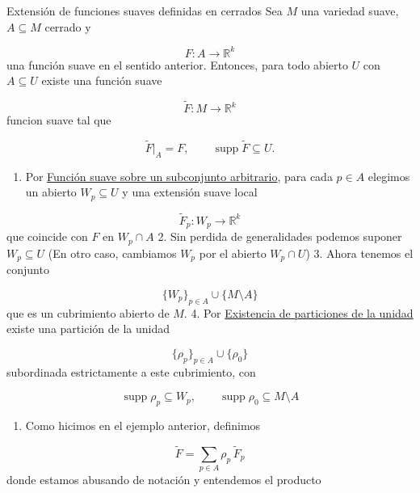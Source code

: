 \label{blk:cf02ec}
\begin{bookproposition}{Extensión de funciones suaves definidas en cerrados}
Sea $M$ una variedad suave, $A\subseteq M$ cerrado y

\[
F:A\to\mathbb R^k
\]
una función suave en el sentido anterior. Entonces, para todo abierto $U$ con $A\subseteq U$ existe una función suave

\[
\widetilde F:M\to\mathbb R^k
\]
funcion suave tal que

\[
\widetilde F|_A=F,
\qquad
\operatorname{supp}\widetilde F\subseteq U.
\]
\end{bookproposition}
\begin{bookproof}{}
\begin{enumerate}
\item Por \hyperref[blk:cf02ec]{Función suave sobre un subconjunto arbitrario}, para cada $p\in A$ elegimos un abierto $W_p\subseteq U$ y una extensión suave local
\end{enumerate}
\[
\widetilde F_p:W_p\to\mathbb R^k
\]
que coincide con $F$ en $W_{p}\cap A$ 2. Sin perdida de generalidades podemos suponer $W_{p}\subseteq U$ (En otro caso, cambiamos $W_{p}$ por el abierto $W_{p}\cap U$) 3. Ahora tenemos el conjunto

\[
\{W_p\}_{p\in A}\cup\{M\setminus A\}
\]
que es un cubrimiento abierto de $M$. 4. Por \hyperref[blk:eafe2b]{Existencia de particiones de la unidad} existe una partición de la unidad

\[
\{\rho_p\}_{p\in A}\cup\{\rho_0\}
\]
subordinada estrictamente a este cubrimiento, con

\[
\operatorname{supp}\rho_p\subseteq W_p, \qquad \operatorname{supp}\rho_0\subseteq M\setminus A
\]
\begin{enumerate}[start=5]
\item Como hicimos en el ejemplo anterior, definimos
\end{enumerate}
\[
\widetilde F=\sum_{p\in A}\rho_p\,\widetilde F_p
\]
donde estamos abusando de notación y entendemos el producto


\end{bookproof}
